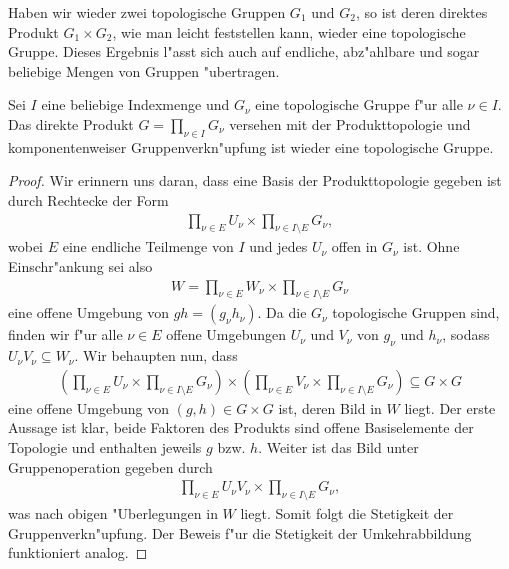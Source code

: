 	Haben wir wieder zwei topologische Gruppen $G_1$ und $G_2$, so ist deren direktes Produkt $G_1\times G_2$, wie man leicht feststellen kann, wieder eine topologische Gruppe.
	Dieses Ergebnis l"asst sich auch auf endliche, abz"ahlbare und sogar beliebige Mengen von Gruppen "ubertragen. 
	\begin{lemma}\label{lemma:topogroup:directproduct}
		Sei $I$ eine beliebige Indexmenge und $G_\nu$ eine topologische Gruppe f"ur alle $\nu\in I$. 
		Das direkte Produkt $G = \prod_{\nu\in I} G_\nu$ versehen mit der Produkttopologie und komponentenweiser Gruppenverkn"upfung ist wieder eine topologische Gruppe.
	\end{lemma}
	\begin{proof}
		Wir erinnern uns daran, dass eine Basis der Produkttopologie gegeben ist durch Rechtecke der Form
		\begin{align*}
			\prod_{\nu\in E} U_\nu \times \prod_{\nu\in I\setminus E}  G_\nu,
		\end{align*}
		wobei $E$ eine endliche Teilmenge von $I$ und jedes $U_\nu$ offen in $G_\nu$ ist. 
		Ohne Einschr"ankung sei also 
		\begin{align*}
			W = \prod_{\nu\in E} W_\nu \times \prod_{\nu\in I\setminus E}  G_\nu
		\end{align*}
		eine offene Umgebung von $gh = (g_\nu h_\nu)$. 
		Da die $G_\nu$ topologische Gruppen sind, finden wir f"ur  alle $\nu\in E$ offene Umgebungen $U_\nu$ und $V_\nu$ von $g_\nu$ und $h_\nu$,  sodass  $U_\nu V_\nu \subseteq W_\nu$. Wir behaupten nun, dass
		\begin{align*}
			(\prod_{\nu\in E} U_\nu \times \prod_{\nu\in I\setminus E}  G_\nu) \times (\prod_{\nu\in E} V_\nu \times \prod_{\nu\in I\setminus E}  G_\nu) \subseteq G \times G
		\end{align*}
		eine offene Umgebung von $(g, h) \in G \times G$ ist, deren Bild in $W$ liegt. 
		Der erste Aussage ist klar, beide Faktoren des Produkts sind offene Basiselemente der Topologie und enthalten jeweils $g$ bzw. $h$.
		Weiter ist das Bild unter Gruppenoperation gegeben durch
		\begin{align*}
			\prod_{\nu\in E} U_\nu V_\nu \times \prod_{\nu\in I\setminus E}  G_\nu,
		\end{align*}
		was nach obigen "Uberlegungen in $W$ liegt.
		Somit folgt die Stetigkeit der Gruppenverkn"upfung.
		Der Beweis f"ur die Stetigkeit der Umkehrabbildung funktioniert analog.
	\end{proof}
	

